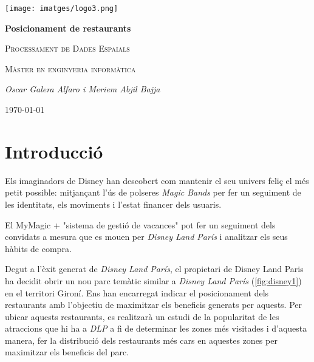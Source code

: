 \documentclass[12pt]{article}
\begin{document}
\begin{titlepage}
		\centering
		\texttt{[image: imatges/logo3.png]}\par\vspace{1cm}
		{\huge\bfseries Posicionament de restaurants\par}
		\vspace{0.3cm}
		{\scshape\Large Processament de Dades Espaials\par}
		\vspace{0.2cm}
		{\scshape\Large Màster en enginyeria informàtica\par}
		\vspace{1.5cm}
		{\Large\itshape Oscar Galera Alfaro i Meriem Abjil Bajja\par}
		\vfill
		{\large \today\par}
\end{titlepage}
\tableofcontents

\clearpage

\listoffigures

\clearpage

\section{Introducció}

Els imaginadors de Disney han descobert com mantenir el seu univers feliç el més petit possible: mitjançant l'ús de polseres \textit{Magic Bands} per fer un seguiment de les identitats, els moviments i l'estat financer dels usuaris.

El MyMagic + "sistema de gestió de vacances" pot fer un seguiment dels convidats a mesura que es mouen per \textit{Disney Land París} i analitzar els seus hàbits de compra.

Degut a l'èxit generat de \textit{Disney Land París}, el propietari de Disney Land Paris ha decidit obrir un nou parc temàtic similar a \textit{Disney Land París} (\ref{fig:disney1}) en el territori Gironí. Ens han encarregat indicar el posicionament dels restaurants amb l'objectiu de maximitzar els beneficis generats per aquests. Per ubicar aquests restaurants, es realitzarà un estudi de la popularitat de les atraccions que hi ha a \textit{DLP} a fi de determinar les zones més visitades i d'aquesta manera, fer la distribució dels restaurants més cars en aquestes zones per maximitzar els beneficis del parc.
\end{document}
